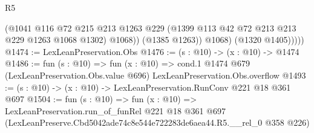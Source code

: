 \begin{lexlean}{R5}
\begin{coremodule}
                  (@1041
                    @116
                    @72
                    @215
                    @213
                    @1263
                    @229
                    (@1399 @113 @42 @72 @213 @213 @229 @1263 @1068 @1302)
                    @1068))
                (@1385 @1263))
              @1068)
            (@1320 @1405)))))
@1474 := LexLeanPreservation.Obs
@1476 := (s : @10) -> (x : @10) -> @1474
@1486 := fun (s : @10) =>
  fun (x : @10) =>
  cond.{1} @1474 @679 (LexLeanPreservation.Obs.value @696) LexLeanPreservation.Obs.overflow
@1493 := (s : @10) -> (x : @10) -> LexLeanPreservation.RunConv @221 @18 @361 @697
@1504 := fun (s : @10) =>
  fun (x : @10) =>
  LexLeanPreservation.run_of_funRel
    @221
    @18
    @361
    @697
    (LexLeanPreserve.Cbd5042ade74c8e544e722283de6aea44.R5.__rel_0 @358 @226)
\end{coremodule}
\end{lexlean}
